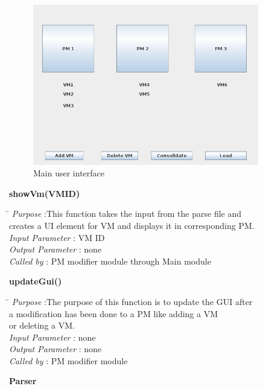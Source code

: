 \documentclass[a4paper,11pt]{article}
\begin{document}
\begin{figure}[h]
\centering
\includegraphics[height=7cm]{images/GUI.png}
\caption{Main user interface}
\label{fig:GUI}
\end{figure}
\textbf{showVm(VM\textunderscore ID)}  
\begin{tabbing}
\hspace*{4cm}\= \kill
 \textit{Purpose} \> :This function takes the input from the parse file and \\ \>creates a UI element for VM and displays it in corresponding PM.\\
  \textit{Input Parameter} \> : VM ID \\
  \textit{Output Parameter} \> : none \\
  \textit{Called by} \> : PM modifier module through Main module
  
\end{tabbing}
\textbf{updateGui()}  
\begin{tabbing}
\hspace*{4cm}\= \kill
 \textit{Purpose} \> :The purpose of this function is to update the GUI after\\ \> a modification has been done to a PM like adding a VM \\ \>or deleting a VM.\\
  \textit{Input Parameter} \> : none \\
  \textit{Output Parameter} \> : none \\
  \textit{Called by} \> : PM modifier module
  
\end{tabbing}
\textbf{Parser}
\end{document}
